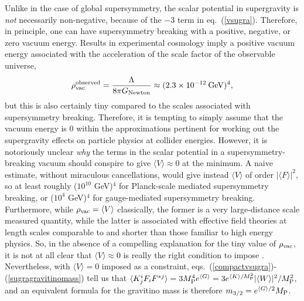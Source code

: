 \documentclass[11pt]{article}
\def\beq{\begin{eqnarray}}
\def\eeq{\end{eqnarray}}
\def\MPlanck{M_{\rm P}}
\begin{document}
Unlike in the case of global supersymmetry, the scalar potential in 
supergravity is {\it not} necessarily non-negative, because of the $-3$ 
term in eq.~(\ref{vsugra}). Therefore, in principle, one can have 
supersymmetry breaking with a positive, negative, or zero vacuum energy. 
Results in experimental cosmology \cite{cosmokramer} imply 
a positive vacuum energy associated with the acceleration of the
scale factor of the observable universe,
\beq
\rho_{\rm vac}^{\rm observed} = \frac{\Lambda}{8\pi G_{\rm Newton}} \approx 
(2.3 \times 10^{-12}\>{\rm GeV})^4,
\eeq
but this is also certainly tiny compared to the scales associated with 
supersymmetry breaking. Therefore, it is tempting to simply assume that 
the vacuum energy is 0 within the approximations pertinent for working out 
the supergravity effects on particle physics at collider energies. However, it 
is notoriously unclear {\em why} the terms in the scalar potential in a 
supersymmetry-breaking vacuum should conspire to give $\langle V \rangle 
\approx 0$ at the minimum.  A naive estimate, without miraculous 
cancellations, would give instead $ \langle V \rangle$ of order $|\langle F 
\rangle|^2$, so at least roughly ($10^{10}$ GeV)$^4$ for Planck-scale 
mediated supersymmetry breaking, or ($10^4$ GeV)$^4$ for gauge-mediated 
supersymmetry breaking. Furthermore, while $\rho_{\rm vac} = \langle V 
\rangle$ classically, the former is a very large-distance scale measured 
quantity, while the latter is associated with effective field theories at 
length scales comparable to and shorter than those familiar to high energy 
physics. So, in the absence of a compelling explanation for the tiny value 
of $\rho_{\rm vac}$, it is not at all clear that $\langle V \rangle 
\approx 0$ is really the right condition to impose \cite{cosmock}. 
Nevertheless, with $\langle V \rangle = 0$ imposed as a 
constraint, 
eqs.~(\ref{compactvsugra})-(\ref{sugragravitinomass}) tell us that $ 
\langle K_j^i F_i F^{*j} \rangle = 3 \MPlanck^4 e^{\langle G \rangle} = 3 
e^{\langle K \rangle/\MPlanck^2} |\langle W \rangle|^2/\MPlanck^2$, and an 
equivalent formula for the gravitino mass is therefore $m_{3/2} = 
e^{\langle G\rangle/2} \MPlanck$.
\end{document}
